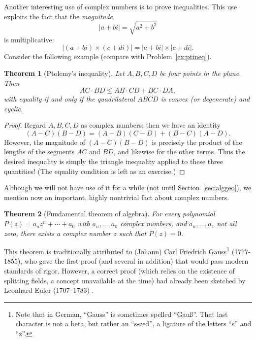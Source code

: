 \documentclass[12pt]{book}
\numberwithin{exc}{section}
\numberwithin{figure}{section}
\newtheorem{theorem}{Theorem}[section]
\numberwithin{equation}{theorem}
\begin{document}
Another interesting use of complex numbers is to prove 
inequalities. This
use exploits the fact that the \emph{magnitude} 
\[
|a+bi| = \sqrt{a^2 + b^2}
\]
is multiplicative:
\[
|(a+bi) \times (c+di)| = |a+bi|\times |c+di|.
\]
Consider the following example (compare with Problem~\ref{ex:ptineq}).
\begin{theorem}[Ptolemy's inequality] \label{thm:ptineq}
Let $A,B,C,D$ be four points in the plane. Then
\[
AC \cdot BD \leq AB \cdot CD + BC \cdot DA,
\]
with equality if and only if the quadrilateral $ABCD$ is convex (or
degenerate) and cyclic.
\end{theorem}
\begin{proof}
Regard $A,B,C,D$ as complex numbers; then we have an identity
\[
(A-C)(B-D) = (A-B)(C-D) + (B-C)(A-D).
\]
However, the magnitude of $(A-C)(B-D)$ is precisely the product of the 
lengths of the segments $AC$ and $BD$, and likewise for the other 
terms. Thus the desired inequality is simply the triangle inequality 
applied to these three quantities! (The equality condition is left as 
an exercise.)
\end{proof}

Although we will not have use of it for a while (not until 
Section~\ref{sec:alggeo}), we mention now an important, highly 
nontrivial fact about complex numbers.
\begin{theorem}[Fundamental theorem of algebra]
For every polynomial $P(z) = a_n z^n + \cdots + a_0$ with
$a_n,\dots,a_0$ complex numbers, and $a_n, \dots, a_1$ not all zero,
there exists a complex number $z$ such that $P(z) = 0$.
\end{theorem}
This theorem is traditionally attributed to 
(Johann) Carl Friedrich 
Gauss\footnote{Note that in German, ``Gauss'' is sometimes spelled
``Gau\ss''. That last character is not a beta, but rather an ``s-zed'', 
a ligature
of the letters ``s'' and ``z''.} 
(1777-1855), 
who gave the first proof (and several in addition) 
that would pass modern standards of rigor. However,
a correct proof (which relies on the existence of splitting fields, a concept
unavailable at the time) had already been sketched by Leonhard Euler
(1707--1783) .
\end{document}
